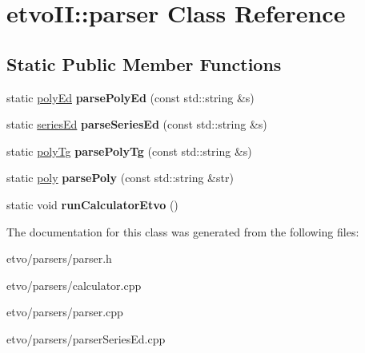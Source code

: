\hypertarget{classetvo_i_i_1_1parser}{}\section{etvo\+II\+:\+:parser Class Reference}
\label{classetvo_i_i_1_1parser}
\subsection*{Static Public Member Functions}
\begin{DoxyCompactItemize}
\item 
\mbox{\label{classetvo_i_i_1_1parser_aaf779f48960c18a9021b6270752f44ca}} 
static \mbox{\hyperlink{classetvo_i_i_1_1poly_ed}{poly\+Ed}} {\bfseries parse\+Poly\+Ed} (const std\+::string \&s)
\item 
\mbox{\label{classetvo_i_i_1_1parser_aba1401a254d4227d4bc6f236efc2f4c3}} 
static \mbox{\hyperlink{classetvo_i_i_1_1series_ed}{series\+Ed}} {\bfseries parse\+Series\+Ed} (const std\+::string \&s)
\item 
\mbox{\label{classetvo_i_i_1_1parser_acdcc3451e69e50b0e3f8c24cac299bf8}} 
static \mbox{\hyperlink{classetvo_i_i_1_1poly_tg}{poly\+Tg}} {\bfseries parse\+Poly\+Tg} (const std\+::string \&s)
\item 
\mbox{\label{classetvo_i_i_1_1parser_a61226859a639ceaa441064f321766527}} 
static \mbox{\hyperlink{classetvo_i_i_1_1poly}{poly}} {\bfseries parse\+Poly} (const std\+::string \&str)
\item 
\mbox{\label{classetvo_i_i_1_1parser_ae871e7ac21dfcca6e707729722c5818d}} 
static void {\bfseries run\+Calculator\+Etvo} ()
\end{DoxyCompactItemize}


The documentation for this class was generated from the following files\+:\begin{DoxyCompactItemize}
\item 
etvo/parsers/parser.\+h\item 
etvo/parsers/calculator.\+cpp\item 
etvo/parsers/parser.\+cpp\item 
etvo/parsers/parser\+Series\+Ed.\+cpp\end{DoxyCompactItemize}
